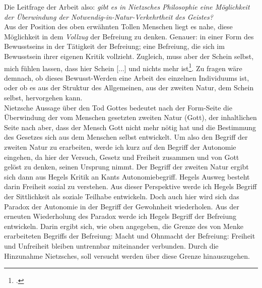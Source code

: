\documentclass[12pt, a4paper, openany]{report}
\begin{document}
Die Leitfrage der Arbeit also: \textit{gibt es in Nietzsches Philosophie eine Möglichkeit der Überwindung der Notwendig-in-Natur-Verkehrtheit des Geistes?}\\
Aus der Position des oben erwähnten \glqq Tollen Menschen\grqq{} liegt es nahe, diese Möglichkeit in dem \textit{Vollzug} der Befreiung zu denken. 
Genauer: in einer Form des Bewusstseins in der Tätigkeit der Befreiung; 
eine Befreiung, die sich im Bewusstsein ihrer eigenen Kritik vollzieht.
Zugleich, muss aber der Schein selbst, \glqq mich fühlen lassen, dass hier Schein [...] und nichts mehr ist\grqq\footcite[][417.]{nietzsche_morgenrote_1999}.
Zu fragen wäre demnach, ob dieses Bewusst-Werden eine Arbeit des einzelnen Individuums ist, oder ob es aus der Struktur des Allgemeinen, aus der zweiten Natur, dem Schein selbst, hervorgehen kann.\\

Nietzsche Aussage über den Tod Gottes bedeutet nach der Form-Seite die Überwindung der vom Menschen gesetzten zweiten Natur (Gott), der inhaltlichen Seite nach aber, dass der Mensch Gott nicht mehr nötig hat und die Bestimmung des Gesetzes sich aus dem Menschen selbst entwickelt. 
Um also den Begriff der zweiten Natur zu erarbeiten, werde ich kurz auf den Begriff der Autonomie eingehen, da hier der Versuch, Gesetz und Freiheit zusammen und von Gott gelöst zu denken, seinen Ursprung nimmt. 
Der Begriff der zweiten Natur ergibt sich dann aus Hegels Kritik an Kants Autonomiebegriff.
Hegels Ausweg besteht darin Freiheit sozial zu verstehen. 
Aus dieser Perspektive werde ich Hegels Begriff der Sittlichkeit als soziale Teilhabe entwickeln.
Doch auch hier wird sich das Paradox der Autonomie in der Begriff der Gewohnheit wiederholen.
Aus der erneuten Wiederholung des Paradox werde ich Hegels Begriff der Befreiung entwickeln.
Darin ergibt sich, wie oben angegeben, die Grenze des von Menke erarbeiteten Begriffs der Befreiung:
Macht und Ohnmacht der Befreiung: Freiheit und Unfreiheit bleiben untrennbar miteinander verbunden.
Durch die Hinzunahme Nietzsches, soll versucht werden über diese Grenze hinauszugehen.\\
\end{document}
